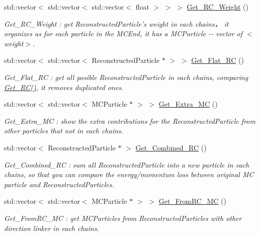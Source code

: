 \begin{DoxyCompactItemize}
std::vector$<$ std::vector$<$ std::vector$<$ float $>$ $>$ $>$ \hyperlink{classToolSet_1_1CChain__Vec_aeb5adc8cde13c82d7727efb02241d637}{Get\_\-RC\_\-Weight} ()
\begin{DoxyCompactList}\small\item\em Get\_\-RC\_\-Weight : get ReconstructedParticle's weight in each chains， it organizes as for each particle in the MCEnd, it has a MCParticle -\/-\/ vector of $<$weight$>$. \item\end{DoxyCompactList}\item 
std::vector$<$ std::vector$<$ ReconstructedParticle $\ast$ $>$ $>$ \hyperlink{classToolSet_1_1CChain__Vec_af8c4b4a166397de13996edf3aa3190e7}{Get\_\-Flat\_\-RC} ()
\begin{DoxyCompactList}\small\item\em Get\_\-Flat\_\-RC : get all posible ReconstructedParticle in each chains, comparing \hyperlink{classToolSet_1_1CChain__Vec_a790838ea04f22624ad047e8e3f351db5}{Get\_\-RC()}, it removes duplicated ones. \item\end{DoxyCompactList}\item 
std::vector$<$ std::vector$<$ MCParticle $\ast$ $>$ $>$ \hyperlink{classToolSet_1_1CChain__Vec_ac0d39c70d1e3f0498374b1549ea34019}{Get\_\-Extra\_\-MC} ()
\begin{DoxyCompactList}\small\item\em Get\_\-Extra\_\-MC : show the extra contributions for the ReconstructedParticle from other particles that not in each chains. \item\end{DoxyCompactList}\item 
std::vector$<$ ReconstructedParticle $\ast$ $>$ \hyperlink{classToolSet_1_1CChain__Vec_a9a4356193e3c851e7fa16c3a8158e959}{Get\_\-Combined\_\-RC} ()
\begin{DoxyCompactList}\small\item\em Get\_\-Combined\_\-RC : sum all ReconstructedParticle into a new particle in each chains, so that you can compare the energy/momentum loss between original MC particle and ReconstructedParticles. \item\end{DoxyCompactList}\item 
std::vector$<$ std::vector$<$ MCParticle $\ast$ $>$ $>$ \hyperlink{classToolSet_1_1CChain__Vec_ab8d0093a6613c407e546d988ef5d8e0a}{Get\_\-FromRC\_\-MC} ()
\begin{DoxyCompactList}\small\item\em Get\_\-FromRC\_\-MC : get MCParticles from ReconstructedParticles with other direction linker in each chains. \item\end{DoxyCompactList}\item 

\end{DoxyCompactItemize}
